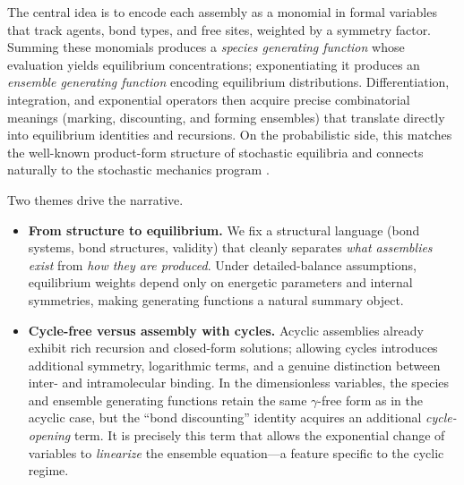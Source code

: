 \documentclass[11pt]{amsart}
\theoremstyle{definition}
\theoremstyle{plain}
\theoremstyle{remark}
\begin{document}
The central idea is to encode each assembly as a monomial in formal variables that track agents, bond types, and free sites, weighted by a symmetry factor.
Summing these monomials produces a \emph{species generating function} whose evaluation yields equilibrium concentrations; exponentiating it produces an \emph{ensemble generating function} encoding equilibrium distributions.
Differentiation, integration, and exponential operators then acquire precise combinatorial meanings (marking, discounting, and forming ensembles) that translate directly into equilibrium identities and recursions.
On the probabilistic side, this matches the well-known product-form structure of stochastic equilibria and connects naturally to the stochastic mechanics program \cite{whittle1986systems,baez2018quantum,baez2015quantum}.

Two themes drive the narrative.
\begin{itemize}
  \item \textbf{From structure to equilibrium.} We fix a structural language (bond systems, bond structures, validity) that cleanly separates \emph{what assemblies exist} from \emph{how they are produced}. Under detailed-balance assumptions, equilibrium weights depend only on energetic parameters and internal symmetries, making generating functions a natural summary object.
  \item \textbf{Cycle-free versus assembly with cycles.} Acyclic assemblies already exhibit rich recursion and closed-form solutions; allowing cycles introduces additional symmetry, logarithmic terms, and a genuine distinction between inter- and intramolecular binding. In the dimensionless variables, the species and ensemble generating functions retain the same $\gamma$-free form as in the acyclic case, but the ``bond discounting'' identity acquires an additional \emph{cycle-opening} term. It is precisely this term that allows the exponential change of variables to \emph{linearize} the ensemble equation---a feature specific to the cyclic regime.
\end{itemize}
\end{document}
